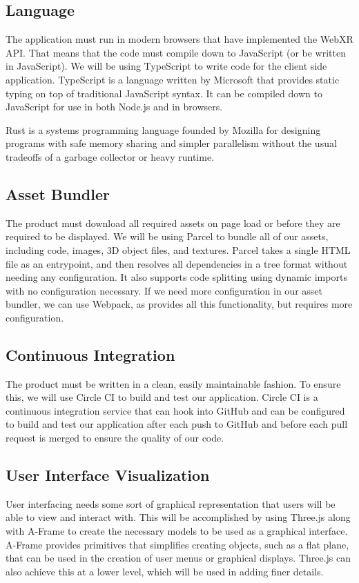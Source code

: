 \documentclass[onecolumn, draftclsnofoot,10pt, compsoc]{IEEEtran}
\begin{document}
\subsection{Language}
The application must run in modern browsers that have implemented the WebXR API. That means that the code must compile down to JavaScript (or be written in JavaScript). We will be using TypeScript to write code for the client side application. TypeScript is a language written by Microsoft that provides static typing on top of traditional JavaScript syntax. It can be compiled down to JavaScript for use in both Node.js and in browsers.

Rust is a systems programming language founded by Mozilla for designing programs with safe memory sharing and simpler parallelism without the usual tradeoffs of a garbage collector or heavy runtime.

\subsection{Asset Bundler}
The product must download all required assets on page load or before they are required to be displayed. We will be using Parcel to bundle all of our assets, including code, images, 3D object files, and textures. Parcel takes a single HTML file as an entrypoint, and then resolves all dependencies in a tree format without needing any configuration. It also supports code splitting using dynamic imports with no configuration necessary. If we need more configuration in our asset bundler, we can use Webpack, as provides all this functionality, but requires more configuration. 

\subsection{Continuous Integration}
The product must be written in a clean, easily maintainable fashion. To ensure this, we will use Circle CI to build and test our application. Circle CI is a continuous integration service that can hook into GitHub and can be configured to build and test our application after each push to GitHub and before each pull request is merged to ensure the quality of our code. 

\subsection{User Interface Visualization}
User interfacing needs some sort of graphical representation that users will be able to view and interact with. This will be accomplished by using Three.js along with A-Frame to create the necessary models to be used as a graphical interface. A-Frame provides primitives that simplifies creating objects, such as a flat plane, that can be used in the creation of user menus or graphical displays. Three.js can also achieve this at a lower level, which will be used in adding finer details.
\end{document}
